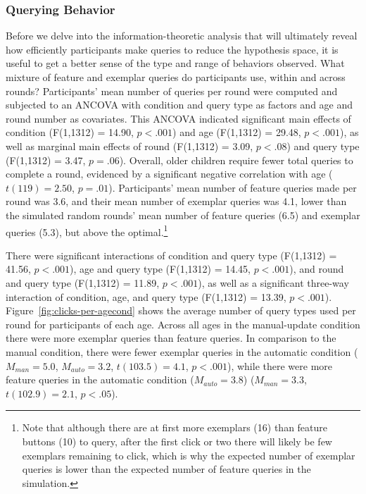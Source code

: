 \documentclass[10pt,letterpaper]{article}
\begin{document}
\subsubsection{Querying Behavior}

Before we delve into the information-theoretic analysis that will ultimately reveal how efficiently participants make queries to reduce the hypothesis space, it is useful to get a better sense of the type and range of behaviors observed. What mixture of feature and exemplar queries do participants use, within and across rounds? Participants' mean number of queries per round were computed and subjected to an ANCOVA with condition and query type as factors and age and round number as covariates. This ANCOVA indicated significant main effects of condition (F(1,1312) = 14.90, $p<.001$) and age (F(1,1312) = 29.48, $p<.001$), as well as marginal main effects of round (F(1,1312) = 3.09, $p<.08$) and query type (F(1,1312) = 3.47, $p=.06$). Overall, older children require fewer total queries to complete a round, evidenced by a significant negative correlation with age ($t(119) = 2.50$, $p=.01$). Participants' mean number of feature queries made per round was 3.6, and their mean number of exemplar queries was 4.1, lower than the simulated random rounds' mean number of feature queries (6.5) and exemplar queries (5.3), but above the optimal.\footnote{Note that although there are at first more exemplars (16) than feature buttons (10) to query, after the first click or two there will likely be few exemplars remaining to click, which is why the expected number of exemplar queries is lower than the expected number of feature queries in the simulation.} 

There were significant interactions of condition and query type (F(1,1312) = 41.56, $p<.001$), age and query type (F(1,1312) = 14.45, $p<.001$), and round and query type (F(1,1312) = 11.89, $p<.001$), as well as a significant three-way interaction of condition, age, and query type (F(1,1312) = 13.39, $p<.001$). Figure~\ref{fig:clicks-per-agecond} shows the average number of query types used per round for participants of each age. Across all ages in the manual-update condition there were more exemplar queries than feature queries. In comparison to the manual condition, there were fewer exemplar queries in the automatic condition ($M_{man} = 5.0$, $M_{auto} = 3.2$, $t(103.5)=4.1$, $p<.001$), while there were more feature queries in the automatic condition ($M_{auto} = 3.8$) ($M_{man} = 3.3$, $t(102.9)=2.1$, $p<.05$). 
\end{document}

